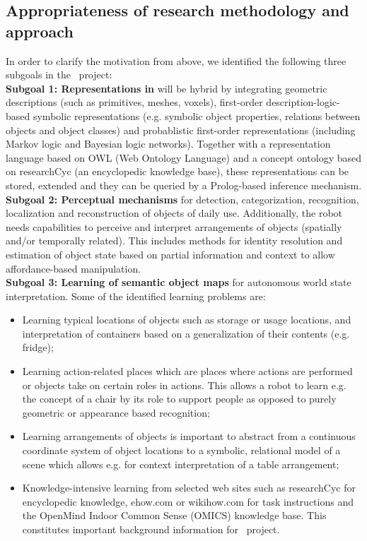 \subsection{Appropriateness of research methodology and approach}
\label{sec:q2}
In order to clarify the motivation from above, we identified
the following three subgoals in the \ksem\ project: \\
\textbf{Subgoal 1: Representations in \ksem} will be hybrid by
  integrating geometric descriptions (such as primitives, meshes,
  voxels), first-order description-logic-based symbolic representations
  (e.g. symbolic object properties, relations between objects and object
  classes) and probablistic first-order representations (including
  Markov logic and Bayesian logic networks).
  Together with a representation language based on OWL (Web Ontology
  Language) and a concept ontology based on researchCyc (an encyclopedic
  knowledge base), these representations can be stored, extended and
  they can be queried by a Prolog-based inference mechanism.\\
\textbf{Subgoal 2: Perceptual mechanisms} for detection,
  categorization, recognition, localization and reconstruction of
  objects of daily use. Additionally, the robot needs capabilities to
  perceive and interpret arrangements of objects (spatially and/or
  temporally related). This includes methods for identity resolution and
  estimation of object state based on partial information and context to
  allow affordance-based manipulation. \\
\textbf{Subgoal 3: Learning of semantic object maps} for autonomous world state
  interpretation. Some of the identified learning problems are:
  \begin{itemize}
    \item Learning typical locations of objects such as storage or
      usage locations, and interpretation of containers based on a
      generalization of their contents (e.g. fridge);
    \item Learning action-related places which are places where actions are
      performed or objects take on certain roles in actions. This allows
      a robot to learn e.g. the concept of a chair by its role to
      support people as opposed to purely geometric or appearance
      based recognition;
    \item Learning arrangements of objects is important to abstract from
      a continuous coordinate system of object locations to a symbolic,
      relational model of a scene which allows e.g. for context
      interpretation of a table arrangement;
    \item Knowledge-intensive learning from selected web sites such as
      researchCyc for encyclopedic knowledge, ehow.com or wikihow.com
      for task instructions and the OpenMind Indoor Common Sense (OMICS)
      knowledge base. This constitutes important background information
      for \ksem\ project.
  \end{itemize}
